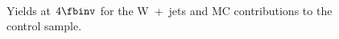 \begin{figure}[h!]
{  }~~
  \\
  \caption{\label{fig:muYields} Yields at $4\fbinv$ for the W~+~jets and \ttbar
  MC contributions to the \texorpdfstring{\mj}{muon plus jets} control sample. }
\end{figure}


